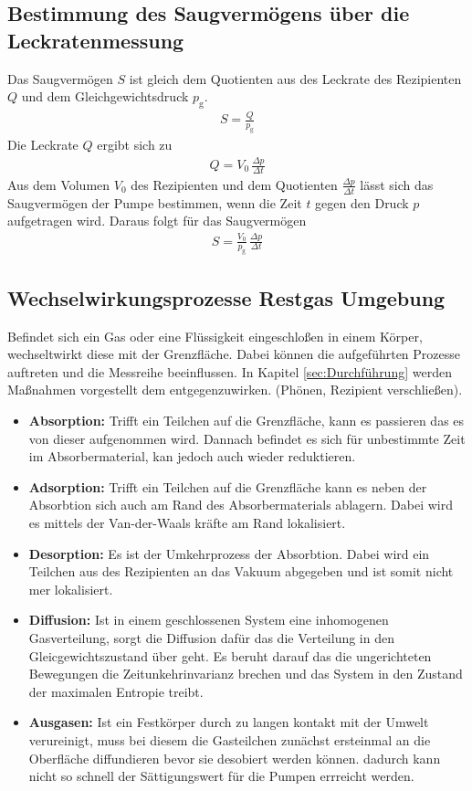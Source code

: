 \subsection{Bestimmung des Saugvermögens über die Leckratenmessung}
Das Saugvermögen $S$ ist gleich dem Quotienten aus des Leckrate des Rezipienten $Q$ und dem Gleichgewichtsdruck $p_\text{g}$.
\begin{align}
   S = \frac{Q}{p_\text{g}}
\end{align}
Die Leckrate $Q$ ergibt sich zu
\begin{align}
   Q = V_0\, \frac{\Delta p}{\Delta t}
\end{align}
Aus dem Volumen $V_0$ des Rezipienten und dem Quotienten $\frac{\Delta p}{\Delta t}$ lässt sich das Saugvermögen der Pumpe bestimmen, wenn die Zeit $t$ gegen den Druck $p$ aufgetragen wird. Daraus folgt für das Saugvermögen
\begin{align}\label{eqn:SaugLeck}
   S = \frac{V_0}{p_\text{g}}\, \frac{\Delta p}{\Delta t}
\end{align}
\subsection{Wechselwirkungsprozesse Restgas Umgebung}
Befindet sich ein Gas oder eine Flüssigkeit eingeschloßen in einem Körper, wechseltwirkt diese mit der Grenzfläche. Dabei können die aufgeführten Prozesse auftreten und die Messreihe beeinflussen. In Kapitel \ref{sec:Durchführung} werden Maßnahmen vorgestellt dem entgegenzuwirken. (Phönen, Rezipient verschließen).
\begin{itemize}
  \item \textbf{Absorption:} Trifft ein Teilchen auf die Grenzfläche, kann es passieren das es von dieser aufgenommen wird. Dannach befindet es sich für unbestimmte Zeit im Absorbermaterial, kan jedoch auch wieder reduktieren.
  \item \textbf{Adsorption:} Trifft ein Teilchen auf die Grenzfläche kann es neben der Absorbtion sich auch am Rand des Absorbermaterials ablagern. Dabei wird es mittels der Van-der-Waals kräfte am Rand lokalisiert.
  \item \textbf{Desorption:} Es ist der Umkehrprozess der Absorbtion. Dabei wird ein Teilchen aus des Rezipienten an das Vakuum abgegeben und ist somit nicht mer lokalisiert. 
  \item \textbf{Diffusion:} Ist in einem geschlossenen System eine inhomogenen Gasverteilung, sorgt die Diffusion dafür das die Verteilung in den Gleicgewichtszustand über geht. Es beruht darauf das die ungerichteten Bewegungen die Zeitunkehrinvarianz brechen und das System in den Zustand der maximalen Entropie treibt.
  \item \textbf{Ausgasen:} Ist ein Festkörper durch zu langen kontakt mit der Umwelt verureinigt, muss bei diesem die Gasteilchen zunächst ersteinmal an die Oberfläche diffundieren bevor sie desobiert werden können. dadurch kann nicht so schnell der Sättigungswert für die Pumpen errreicht werden.
\end{itemize}
